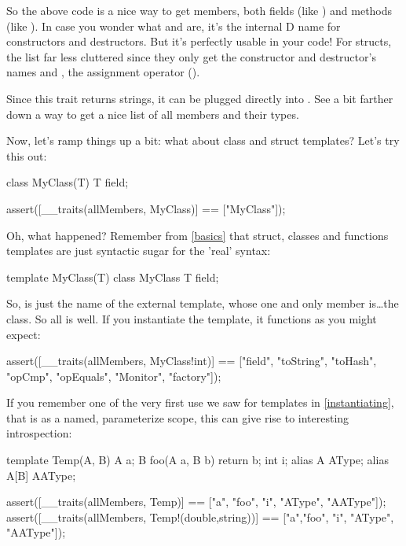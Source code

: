 So the above code is a nice way to get members, both fields (like ) and methods (like ). In case you wonder what  and  are, it's the internal D name for constructors and destructors. But it's perfectly usable in your code! For structs, the list far less cluttered since they only get the constructor and destructor's names and , the assignment operator (\DD{=}).

Since this trait returns strings, it can be plugged directly into . See a bit farther down a way to get a nice list of all members and their types.

Now, let's ramp things up a bit: what about class and struct templates? Let's try this out:

\begin{dcode}
class MyClass(T)
{
    T field;
}

assert([__traits(allMembers, MyClass)] == ["MyClass"]);
\end{dcode}

Oh, what happened? Remember from \autoref{basics} that struct, classes and functions templates are just syntactic sugar for the 'real' syntax:

\begin{dcode}
template MyClass(T)
{
    class MyClass
    {
        T field;
    }
}
\end{dcode}

So,  is just the name of the external template, whose one and only member is\ldots the  class. So all is well. If you instantiate the template, it functions as you might expect:

\begin{dcode}
assert([__traits(allMembers, MyClass!int)] 
    == ["field", "toString", "toHash", "opCmp", 
        "opEquals", "Monitor", "factory"]);
\end{dcode}

If you remember one of the very first use we saw for templates in \ref{instantiating}, that is as a named, parameterize scope, this can give rise to interesting introspection:

\begin{dcode}
template Temp(A, B)
{
    A a;
    B foo(A a, B b) { return b;}
    int i;
    alias A    AType;
    alias A[B] AAType;
}

assert([__traits(allMembers, Temp)] 
    == ["a", "foo", "i", "AType", "AAType"]);
assert([__traits(allMembers, Temp!(double,string))] 
    == ["a","foo", "i", "AType", "AAType"]);
\end{dcode} 

